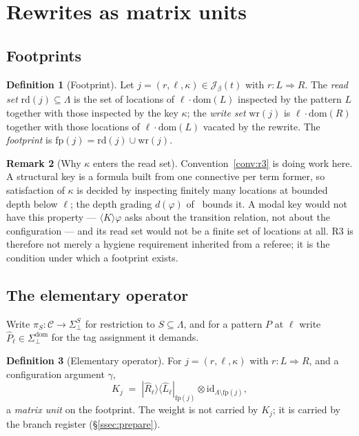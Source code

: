\documentclass[11pt]{article}
\theoremstyle{definition}
\newtheorem{definition}{Definition}[section]
\newtheorem{remark}[definition]{Remark}
\theoremstyle{plain}
\newcommand{\rew}{\Rightarrow}
\newcommand{\Loc}{\Lambda}
\newcommand{\Tags}{\Sigma}
\newcommand{\Tagsb}{\Tags_{\bot}}
\newcommand{\Cfg}{\mathcal{C}}
\newcommand{\Jumps}{\mathcal{J}}
\newcommand{\fp}{\mathrm{fp}}
\newcommand{\id}{\mathrm{id}}
\newcommand{\ketbra}[2]{| #1 \rangle\langle #2 |}
\begin{document}
\section{Rewrites as matrix units}\label{sec:matrixunits}

\subsection{Footprints}

\begin{definition}[Footprint]\label{def:footprint}
Let $j = (r,\ell,\kappa) \in \Jumps_\beta(t)$ with $r : L \rew R$. The \emph{read set}
$\mathrm{rd}(j) \subseteq \Loc$ is the set of locations of $\ell \cdot \mathrm{dom}(L)$
inspected by the pattern $L$ together with those inspected by the key $\kappa$; the
\emph{write set} $\mathrm{wr}(j)$ is $\ell \cdot \mathrm{dom}(R)$ together with those locations
of $\ell\cdot\mathrm{dom}(L)$ vacated by the rewrite. The \emph{footprint} is
$\fp(j) = \mathrm{rd}(j)\cup\mathrm{wr}(j)$.
\end{definition}

\begin{remark}[Why $\kappa$ enters the read set]\label{rem:kapparead}
Convention~\ref{conv:r3} is doing work here. A structural key is a formula built from one
connective per term former, so satisfaction of $\kappa$ is decided by inspecting finitely many
locations at bounded depth below $\ell$; the depth grading $d(\varphi)$ of~\cite{weighted}
bounds it. A modal key would not have this property --- $\langle K \rangle\varphi$ asks about
the transition relation, not about the configuration --- and its read set would not be a finite
set of locations at all. R3 is therefore not merely a hygiene requirement inherited from a
referee; it is the condition under which a footprint exists.
\end{remark}

\subsection{The elementary operator}

Write $\pi_S : \Cfg \to \Tagsb^{S}$ for restriction to $S \subseteq \Loc$, and for a pattern
$P$ at $\ell$ write $\hat{P}_\ell \in \Tagsb^{\mathrm{dom}}$ for the tag assignment it demands.

\begin{definition}[Elementary operator]\label{def:K}
For $j = (r,\ell,\kappa)$ with $r : L \rew R$, and a configuration argument $\gamma$,
\[
  K_j \;=\; \ketbra{\hat{R}_\ell}{\hat{L}_\ell}_{\fp(j)} \otimes \id_{\Loc \setminus \fp(j)},
\]
a \emph{matrix unit} on the footprint. The weight is not carried by $K_j$; it is carried by the
branch register (\S\ref{ssec:prepare}).
\end{definition}
\end{document}
